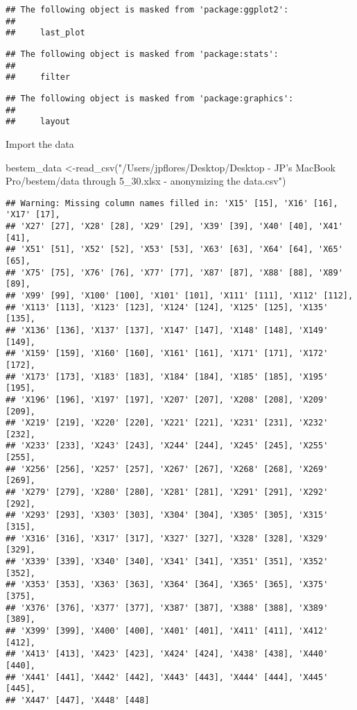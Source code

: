 \documentclass[
]{article}
\newenvironment{Shaded}{\begin{snugshade}}{\end{snugshade}}
\newcommand{\FunctionTok}[1]{\textcolor[rgb]{0.00,0.00,0.00}{#1}}
\newcommand{\NormalTok}[1]{#1}
\newcommand{\OtherTok}[1]{\textcolor[rgb]{0.56,0.35,0.01}{#1}}
\newcommand{\StringTok}[1]{\textcolor[rgb]{0.31,0.60,0.02}{#1}}
\begin{document}
\begin{verbatim}
## The following object is masked from 'package:ggplot2':
## 
##     last_plot
\end{verbatim}

\begin{verbatim}
## The following object is masked from 'package:stats':
## 
##     filter
\end{verbatim}

\begin{verbatim}
## The following object is masked from 'package:graphics':
## 
##     layout
\end{verbatim}

Import the data

\begin{Shaded}
\begin{Highlighting}[]
\NormalTok{bestem\_data }\OtherTok{\textless{}{-}}\FunctionTok{read\_csv}\NormalTok{(}\StringTok{"/Users/jpflores/Desktop/Desktop {-} JP’s MacBook Pro/bestem/data through 5\_30.xlsx {-} anonymizing the data.csv"}\NormalTok{)}
\end{Highlighting}
\end{Shaded}

\begin{verbatim}
## Warning: Missing column names filled in: 'X15' [15], 'X16' [16], 'X17' [17],
## 'X27' [27], 'X28' [28], 'X29' [29], 'X39' [39], 'X40' [40], 'X41' [41],
## 'X51' [51], 'X52' [52], 'X53' [53], 'X63' [63], 'X64' [64], 'X65' [65],
## 'X75' [75], 'X76' [76], 'X77' [77], 'X87' [87], 'X88' [88], 'X89' [89],
## 'X99' [99], 'X100' [100], 'X101' [101], 'X111' [111], 'X112' [112],
## 'X113' [113], 'X123' [123], 'X124' [124], 'X125' [125], 'X135' [135],
## 'X136' [136], 'X137' [137], 'X147' [147], 'X148' [148], 'X149' [149],
## 'X159' [159], 'X160' [160], 'X161' [161], 'X171' [171], 'X172' [172],
## 'X173' [173], 'X183' [183], 'X184' [184], 'X185' [185], 'X195' [195],
## 'X196' [196], 'X197' [197], 'X207' [207], 'X208' [208], 'X209' [209],
## 'X219' [219], 'X220' [220], 'X221' [221], 'X231' [231], 'X232' [232],
## 'X233' [233], 'X243' [243], 'X244' [244], 'X245' [245], 'X255' [255],
## 'X256' [256], 'X257' [257], 'X267' [267], 'X268' [268], 'X269' [269],
## 'X279' [279], 'X280' [280], 'X281' [281], 'X291' [291], 'X292' [292],
## 'X293' [293], 'X303' [303], 'X304' [304], 'X305' [305], 'X315' [315],
## 'X316' [316], 'X317' [317], 'X327' [327], 'X328' [328], 'X329' [329],
## 'X339' [339], 'X340' [340], 'X341' [341], 'X351' [351], 'X352' [352],
## 'X353' [353], 'X363' [363], 'X364' [364], 'X365' [365], 'X375' [375],
## 'X376' [376], 'X377' [377], 'X387' [387], 'X388' [388], 'X389' [389],
## 'X399' [399], 'X400' [400], 'X401' [401], 'X411' [411], 'X412' [412],
## 'X413' [413], 'X423' [423], 'X424' [424], 'X438' [438], 'X440' [440],
## 'X441' [441], 'X442' [442], 'X443' [443], 'X444' [444], 'X445' [445],
## 'X447' [447], 'X448' [448]
\end{verbatim}
\end{document}
